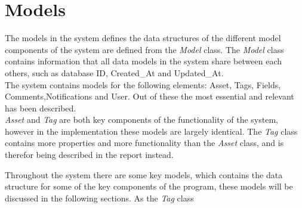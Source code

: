 \section{Models}
The models in the system defines the data structures of the different model components of the system are defined from the \textit{Model} class. The \textit{Model} class contains information that all data models in the system share between each others, such as database ID, Created\_At and Updated\_At. \\
The system contains models for the following elements: Asset, Tags, Fields, Comments,Notifications and User. Out of these the most essential and relevant has been described. \\

\textit{Asset} and \textit{Tag} are both key components of the functionality of the system, however in the implementation these models are largely identical. The \textit{Tag} class contains more properties and more functionality than the \textit{Asset} class, and is therefor being described in the report instead.

Throughout the system there are some key models, which contains the data structure for some of the key components of the program, these models will be discussed in the following sections. As the \textit{Tag} class\\
